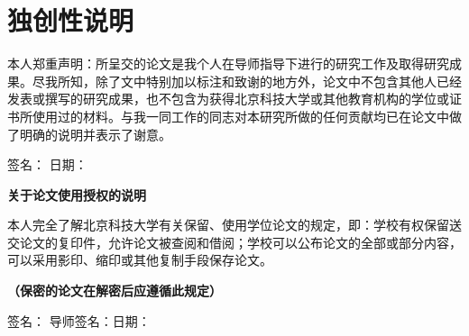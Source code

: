 
\chapter*{\centering \heiti {} \bf 独创性说明}
\doublespacing
本人郑重声明：所呈交的论文是我个人在导师指导下进行的研究工作及取得研究成果。尽我所知，除了文中特别加以标注和致谢的地方外，论文中不包含其他人已经发表或撰写的研究成果，也不包含为获得北京科技大学或其他教育机构的学位或证书所使用过的材料。与我一同工作的同志对本研究所做的任何贡献均已在论文中做了明确的说明并表示了谢意。\par

\vspace{3ex}

\begin{flushright}
签名：\underline{\makebox[3cm]{\qquad}} 日期：\underline{\makebox[3cm]{\qquad}}
\end{flushright}

\vspace{10ex}

\begin{center}
{ \bht \bf 关于论文使用授权的说明} 
\end{center}
\par

\vspace{5ex}

本人完全了解北京科技大学有关保留、使用学位论文的规定，即：学校有权保留送交论文的复印件，允许论文被查阅和借阅；学校可以公布论文的全部或部分内容，可以采用影印、缩印或其他复制手段保存论文。\par
\textbf{（保密的论文在解密后应遵循此规定）}\par

\vspace{3ex}

\begin{flushright}
签名：\underline{\makebox[3cm]{\qquad}} 导师签名：\underline{\makebox[3cm]{\qquad}}日期：\underline{\makebox[3cm]{\qquad}}
\end{flushright}
